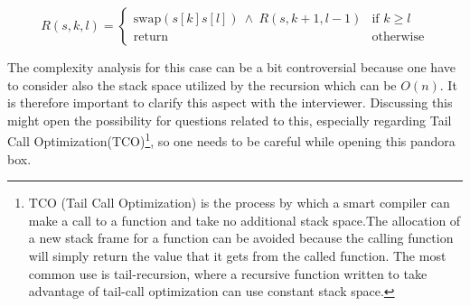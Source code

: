 \begin{equation}
	R(s, k, l)=\begin{cases} 
\text{swap}(s[k]s[l]) \: \wedge \: R(s,k+1, l-1) & \text{if } k\geq l\\
\text{return} & \text{otherwise}
\end{cases}
\label{eq:string_reversal_recursion}
\end{equation} 

The complexity analysis for this case can be a bit controversial because one have to consider also the stack space utilized by the recursion which can be $O(n)$. It is therefore important to clarify this aspect with the interviewer. Discussing this might open the possibility for questions related to this, especially regarding Tail Call Optimization(TCO)\footnote{TCO (Tail Call Optimization) is the process by which a smart compiler can make a call to a function and take no additional stack space.The allocation of a new stack frame for a function can be avoided because the calling function will simply return the value that it gets from the called function. The most common use is tail-recursion, where a recursive function written to take advantage of tail-call optimization can use constant stack space.\nopagebreak}, so one needs to be careful while opening this pandora box.